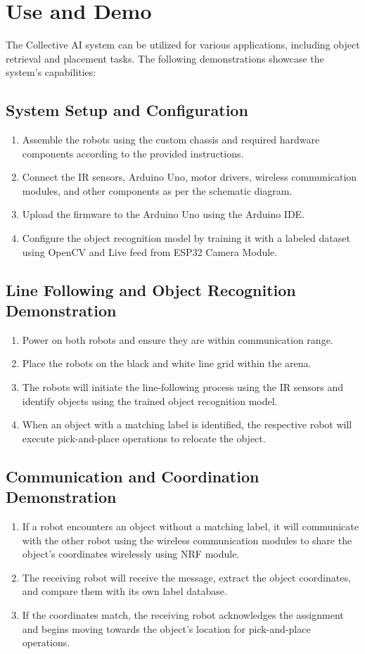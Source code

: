 \documentclass[a4paper,12pt,oneside]{book}
\begin{document}
\section{Use and Demo}
The Collective AI system can be utilized for various applications, including object retrieval and placement tasks. The following demonstrations showcase the system's capabilities:

\subsection{System Setup and Configuration}
\begin{enumerate}
  \item Assemble the robots using the custom chassis and required hardware components according to the provided instructions.
  \item Connect the IR sensors, Arduino Uno, motor drivers, wireless communication modules, and other components as per the schematic diagram.
  \item Upload the firmware to the Arduino Uno using the Arduino IDE.
  \item Configure the object recognition model by training it with a labeled dataset using OpenCV and Live feed from ESP32 Camera Module.
\end{enumerate}

\subsection{Line Following and Object Recognition Demonstration}
\begin{enumerate}
  \item Power on both robots and ensure they are within communication range.
  \item Place the robots on the black and white line grid within the arena.
  \item The robots will initiate the line-following process using the IR sensors and identify objects using the trained object recognition model.
  \item When an object with a matching label is identified, the respective robot will execute pick-and-place operations to relocate the object.
\end{enumerate}

\subsection{Communication and Coordination Demonstration}
\begin{enumerate}
  \item If a robot encounters an object without a matching label, it will communicate with the other robot using the wireless communication modules to share the object's coordinates wirelessly using NRF module.
  \item The receiving robot will receive the message, extract the object coordinates, and compare them with its own label database.
  \item If the coordinates match, the receiving robot acknowledges the assignment and begins moving towards the object's location for pick-and-place operations.
\end{enumerate}
\end{document}
